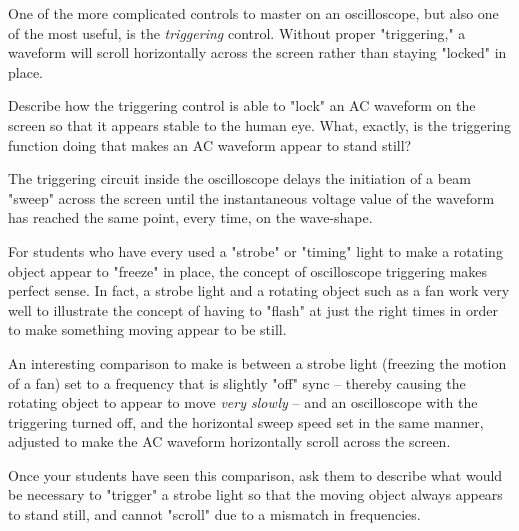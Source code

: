 

One of the more complicated controls to master on an oscilloscope, but also one of the most useful, is the {\it triggering} control.  Without proper "triggering," a waveform will scroll horizontally across the screen rather than staying "locked" in place.

Describe how the triggering control is able to "lock" an AC waveform on the screen so that it appears stable to the human eye.  What, exactly, is the triggering function doing that makes an AC waveform appear to stand still?







The triggering circuit inside the oscilloscope delays the initiation of a beam "sweep" across the screen until the instantaneous voltage value of the waveform has reached the same point, every time, on the wave-shape.







For students who have every used a "strobe" or "timing" light to make a rotating object appear to "freeze" in place, the concept of oscilloscope triggering makes perfect sense.  In fact, a strobe light and a rotating object such as a fan work very well to illustrate the concept of having to "flash" at just the right times in order to make something moving appear to be still.

An interesting comparison to make is between a strobe light (freezing the motion of a fan) set to a frequency that is slightly "off" sync -- thereby causing the rotating object to appear to move {\it very slowly} -- and an oscilloscope with the triggering turned off, and the horizontal sweep speed set in the same manner, adjusted to make the AC waveform horizontally scroll across the screen.

Once your students have seen this comparison, ask them to describe what would be necessary to "trigger" a strobe light so that the moving object always appears to stand still, and cannot "scroll" due to a mismatch in frequencies.




